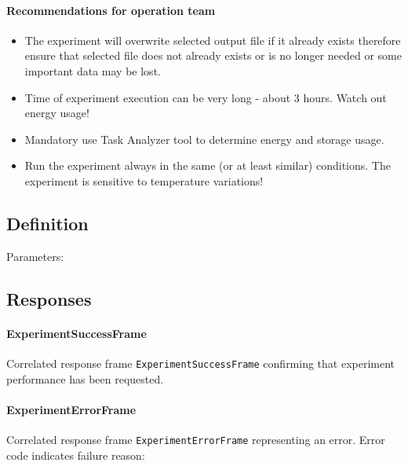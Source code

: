 \paragraph{Recommendations for operation team} \mbox{}
\begin{itemize}
    \item The experiment will overwrite selected output file if it already exists therefore ensure 
          that selected file does not already exists or is no longer needed or some important data
          may be lost.
    \item Time of experiment execution can be very long - about 3 hours. Watch out energy usage!
    \item Mandatory use Task Analyzer tool to determine energy and storage usage.
    \item Run the experiment always in the same (or at least similar) conditions. The experiment is sensitive
          to temperature variations!

\end{itemize}

\subsection{Definition}

Parameters: 

\begin{tcarglist}
\end{tcarglist}

\subsection{Responses}
\paragraph{ExperimentSuccessFrame}

Correlated response frame \texttt{ExperimentSuccessFrame} confirming 
that \radfet experiment performance has been requested.

\paragraph{ExperimentErrorFrame}
Correlated response frame \texttt{ExperimentErrorFrame} representing an error. 
Error code indicates failure reason:

